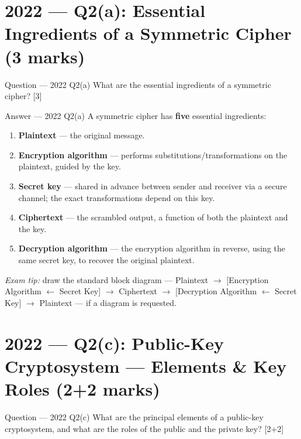 \documentclass[12pt,a4paper]{article}
\begin{document}
\newpage
\section{2022 --- Q2(a): Essential Ingredients of a Symmetric Cipher (3 marks)}

\begin{qbox}{Question --- 2022 Q2(a)}
What are the essential ingredients of a symmetric cipher? \hfill [3]
\end{qbox}

\begin{solbox}{Answer --- 2022 Q2(a)}
A symmetric cipher has \textbf{five} essential ingredients:
\begin{enumerate}[noitemsep]
  \item \textbf{Plaintext} --- the original message.
  \item \textbf{Encryption algorithm} --- performs substitutions/transformations on the plaintext, guided by the key.
  \item \textbf{Secret key} --- shared in advance between sender and receiver via a secure channel; the exact transformations depend on this key.
  \item \textbf{Ciphertext} --- the scrambled output, a function of both the plaintext and the key.
  \item \textbf{Decryption algorithm} --- the encryption algorithm in reverse, using the same secret key, to recover the original plaintext.
\end{enumerate}
\emph{Exam tip:} draw the standard block diagram --- Plaintext $\to$ [Encryption Algorithm $\xleftarrow{}$ Secret Key] $\to$ Ciphertext $\to$ [Decryption Algorithm $\xleftarrow{}$ Secret Key] $\to$ Plaintext --- if a diagram is requested.
\end{solbox}

\newpage
\section{2022 --- Q2(c): Public-Key Cryptosystem --- Elements \& Key Roles (2+2 marks)}

\begin{qbox}{Question --- 2022 Q2(c)}
What are the principal elements of a public-key cryptosystem, and what are the roles of the public and the private key? \hfill [2+2]
\end{qbox}
\end{document}
